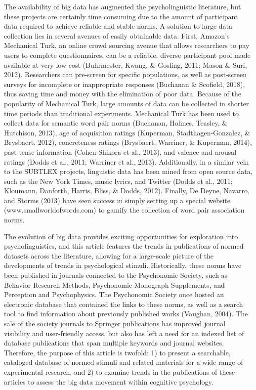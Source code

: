 \documentclass[english,man]{apa6}
\theoremstyle{definition}
\theoremstyle{definition}
\theoremstyle{definition}
\theoremstyle{remark}
\begin{document}
The availability of big data has augmented the psycholinguistic
literature, but these projects are certainly time consuming due to the
amount of participant data required to achieve reliable and stable
norms. A solution to large data collection lies in several avenues of
easily obtainable data. First, Amazon's Mechanical Turk, an online crowd
sourcing avenue that allows researchers to pay users to complete
questionnaires, can be a reliable, diverse participant pool made
available at very low cost (Buhrmester, Kwang, \& Gosling, 2011; Mason
\& Suri, 2012). Researchers can pre-screen for specific populations, as
well as post-screen surveys for incomplete or inappropriate responses
(Buchanan \& Scofield, 2018), thus saving time and money with the
elimination of poor data. Because of the popularity of Mechanical Turk,
large amounts of data can be collected in shorter time periods than
traditional experiments. Mechanical Turk has been used to collect data
for semantic word pair norms (Buchanan, Holmes, Teasley, \& Hutchison,
2013), age of acquisition ratings (Kuperman, Stadthagen-Gonzalez, \&
Brysbaert, 2012), concreteness ratings (Brysbaert, Warriner, \&
Kuperman, 2014), past tense information (Cohen-Shikora et al., 2013),
and valence and arousal ratings (Dodds et al., 2011; Warriner et al.,
2013). Additionally, in a similar vein to the SUBTLEX projects,
linguistic data has been mined from open source data, such as the New
York Times, music lyrics, and Twitter (Dodds et al., 2011; Kloumann,
Danforth, Harris, Bliss, \& Dodds, 2012). Finally, De Deyne, Navarro,
and Storms (2013) have seen success in simply setting up a special
website (www.smallworldofwords.com) to gamify the collection of word
pair association norms.

The evolution of big data provides exciting opportunities for
exploration into psycholinguistics, and this article features the trends
in publications of normed datasets across the literature, allowing for a
large-scale picture of the developments of trends in psychological
stimuli. Historically, these norms have been published in journals
connected to the Psychonomic Society, such as Behavior Research Methods,
Psychonomic Monograph Supplements, and Perception and Psychophysics. The
Psychonomic Society once hosted an electronic database that contained
the links to these norms, as well as a search tool to find information
about previously published works (Vaughan, 2004). The sale of the
society journals to Springer publications has improved journal
visibility and user-friendly access, but also has left a need for an
indexed list of database publications that span multiple keywords and
journal websites. Therefore, the purpose of this article is twofold: 1)
to present a searchable, cataloged database of normed stimuli and
related materials for a wide range of experimental research, and 2) to
examine trends in the publications of these articles to assess the big
data movement within cognitive psychology.
\end{document}
